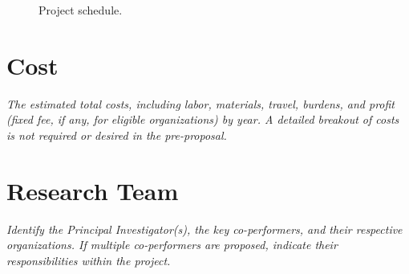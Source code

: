\documentclass[11pt,letterpaper,english,bibliography=totocnumbered, abstract=on]{scrartcl}
\begin{document}
\begin{figure}[h!]
	\caption{Project schedule.} 
	\label{fig:gantt}
\end{figure}


\section{Cost}

\textit{The estimated total costs, including labor, materials, travel, burdens, and profit
(fixed fee, if any, for eligible organizations) by year. A detailed breakout of costs is not
required or desired in the pre-proposal.}

\section{Research Team}

\textit{Identify the Principal Investigator(s), the key co-performers, and
their respective organizations. If multiple co-performers are proposed, indicate their
responsibilities within the project.}
\end{document}
